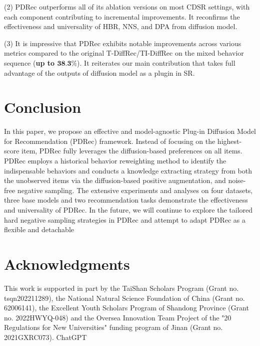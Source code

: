 \documentclass[letterpaper]{article} %
\begin{document}
(2) PDRec outperforms all of its ablation versions on most CDSR settings, with each component contributing to incremental improvements. It reconfirms the effectiveness and universality of HBR, NNS, and DPA from diffusion model.

(3) It is impressive that PDRec exhibits notable improvements across various metrics compared to the original T-DiffRec/TI-DiffRec on the mixed behavior sequence (\textbf{up to $\textbf{38.3\%}$}). It reiterates our main contribution that takes full advantage of the outputs of diffusion model as a plugin in SR.

\section{Conclusion}
In this paper, we propose an effective and model-agnostic Plug-in Diffusion Model for Recommendation (PDRec) framework. Instead of focusing on the highest-score item, PDRec fully leverages the diffusion-based preferences on all items. PDRec employs a historical behavior reweighting method to identify the indispensable behaviors and conducts a knowledge extracting strategy from both the unobserved items via the diffusion-based positive augmentation, and noise-free negative sampling. The extensive experiments and analyses on four datasets, three base models and two recommendation tasks demonstrate the effectiveness and universality of PDRec. In the future, we will continue to explore the tailored hard negative sampling strategies in PDRec and attempt to adapt PDRec as a flexible and detachable


\section{Acknowledgments}
This work is supported in part by the TaiShan Scholars Program (Grant no. tsqn202211289), the National Natural Science Foundation of China (Grant no. 62006141), the Excellent Youth Scholars Program of Shandong Province (Grant no. 2022HWYQ-048) and the Oversea Innovation Team Project of the  "20 Regulations for New Universities" funding program of Jinan (Grant no. 2021GXRC073). ChatGPT

\clearpage

\end{document}

